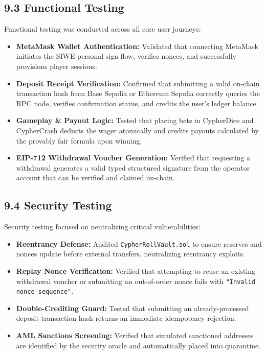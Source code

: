 \subsection*{9.3 Functional Testing}
Functional testing was conducted across all core user journeys:
\begin{itemize}[leftmargin=1.5em]
    \item \textbf{MetaMask Wallet Authentication:} Validated that connecting MetaMask initiates the SIWE personal sign flow, verifies nonces, and successfully provisions player sessions.
    \item \textbf{Deposit Receipt Verification:} Confirmed that submitting a valid on-chain transaction hash from Base Sepolia or Ethereum Sepolia correctly queries the RPC node, verifies confirmation status, and credits the user's ledger balance.
    \item \textbf{Gameplay \& Payout Logic:} Tested that placing bets in CypherDice and CypherCrash deducts the wager atomically and credits payouts calculated by the provably fair formula upon winning.
    \item \textbf{EIP-712 Withdrawal Voucher Generation:} Verified that requesting a withdrawal generates a valid typed structured signature from the operator account that can be verified and claimed on-chain.
\end{itemize}

\subsection*{9.4 Security Testing}
Security testing focused on neutralizing critical vulnerabilities:
\begin{itemize}[leftmargin=1.5em]
    \item \textbf{Reentrancy Defense:} Audited \texttt{CypherRollVault.sol} to ensure reserves and nonces update before external transfers, neutralizing reentrancy exploits.
    \item \textbf{Replay Nonce Verification:} Verified that attempting to reuse an existing withdrawal voucher or submitting an out-of-order nonce fails with \texttt{"Invalid nonce sequence"}.
    \item \textbf{Double-Crediting Guard:} Tested that submitting an already-processed deposit transaction hash returns an immediate idempotency rejection.
    \item \textbf{AML Sanctions Screening:} Verified that simulated sanctioned addresses are identified by the security oracle and automatically placed into quarantine.
\end{itemize}

